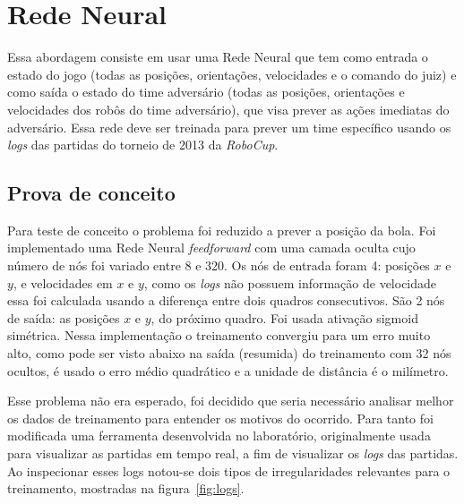 \section{Rede Neural}\label{cap:abordagem_rede_neural}

Essa abordagem consiste em usar uma Rede Neural que tem como entrada o estado do
jogo (todas as posições, orientações, velocidades e o comando do juiz) e como
saída o estado do time adversário (todas as posições, orientações e velocidades
dos robôs do time adversário), que visa prever as ações imediatas do adversário.
Essa rede deve ser treinada para prever um time específico usando os
\textit{logs} das partidas do torneio de 2013 da \textit{RoboCup}.

\subsection{Prova de conceito}


Para teste de conceito o problema foi reduzido a prever a posição da bola. Foi
implementado uma Rede Neural \textit{feedforward} com uma camada oculta cujo
número de nós foi variado entre 8 e 320. Os nós de entrada foram 4: posições $x$
e $y$, e velocidades em $x$ e $y$, como os \textit{logs} não possuem informação
de velocidade essa foi calculada usando a diferença entre dois quadros
consecutivos. São 2 nós de saída: as posições $x$ e $y$, do próximo quadro. Foi
usada ativação sigmoid simétrica. Nessa implementação o treinamento convergiu
para um erro muito alto, como pode ser visto abaixo na saída (resumida) do
treinamento com 32 nós ocultos, é usado o erro médio quadrático e a unidade de
distância é o milímetro.



Esse problema não era esperado, foi decidido que seria necessário analisar
melhor os dados de treinamento para entender os motivos do ocorrido. Para tanto
foi modificada uma ferramenta desenvolvida no laboratório, originalmente usada
para visualizar as partidas em tempo real, a fim de visualizar os \textit{logs}
das partidas. Ao inspecionar esses logs notou-se dois tipos de irregularidades
relevantes para o treinamento, mostradas na figura~\ref{fig:logs}.


